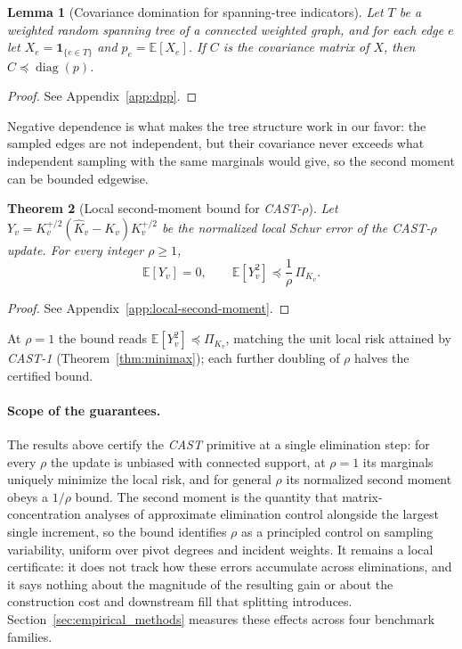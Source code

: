 \documentclass{article}
\newcommand{\CAST}{\textit{CAST}\xspace}
\newcommand{\CASTone}{\textit{CAST-1}\xspace}
\newcommand{\1}{\mathbbm{1}}
\theoremstyle{plain}
\newtheorem{theorem}{Theorem}[section]
\newtheorem{lemma}[theorem]{Lemma}
\begin{document}
\begin{lemma}[Covariance domination for spanning-tree indicators]
\label{lem:dpp}
Let $T$ be a weighted random spanning tree of a connected weighted
graph, and for each edge $e$ let $X_e=\mathbf 1_{\{e\in T\}}$ and
$p_e=\mathbb{E}[X_e]$. If $C$ is the covariance matrix of $X$, then
$C\preceq\operatorname{diag}(p)$.
\end{lemma}

\begin{proof}
See Appendix~\ref{app:dpp}.
\end{proof}

Negative dependence is what makes the tree structure work in our
favor: the sampled edges are not independent, but their covariance
never exceeds what independent sampling with the same marginals would
give, so the second moment can be bounded edgewise.

\begin{theorem}[Local second-moment bound for
\texorpdfstring{\CAST-$\rho$}{CAST-rho}]
\label{thm:local-second-moment}
Let $Y_v=K_v^{+/2}(\widehat K_v-K_v)K_v^{+/2}$ be the normalized local
Schur error of the \CAST-$\rho$ update. For every integer $\rho\geq1$,
\[
\mathbb{E}[Y_v]=0,
\qquad
\mathbb{E}[Y_v^2]\preceq\frac{1}{\rho}\,\Pi_{K_v}.
\]
\end{theorem}

\begin{proof}
See Appendix~\ref{app:local-second-moment}.
\end{proof}

At $\rho=1$ the bound reads $\mathbb{E}[Y_v^2]\preceq\Pi_{K_v}$,
matching the unit local risk attained by \CASTone{}
(Theorem~\ref{thm:minimax}); each further doubling of $\rho$ halves
the certified bound.

\paragraph{Scope of the guarantees.} The results above certify the \CAST{} primitive at a single elimination step: for every $\rho$ the update is unbiased with connected support, at $\rho=1$ its marginals uniquely minimize the local risk, and for general $\rho$ its normalized second moment obeys a $1/\rho$ bound. The second moment is the quantity that matrix-concentration analyses of approximate elimination control alongside the largest single increment, so the bound identifies $\rho$ as a principled control on sampling variability, uniform over pivot degrees and incident weights. It remains a local certificate: it does not track how these errors accumulate across eliminations, and it says nothing about the magnitude of the resulting gain or about the construction cost and downstream fill that splitting introduces. Section~\ref{sec:empirical_methods} measures these effects across four benchmark families.
\end{document}
